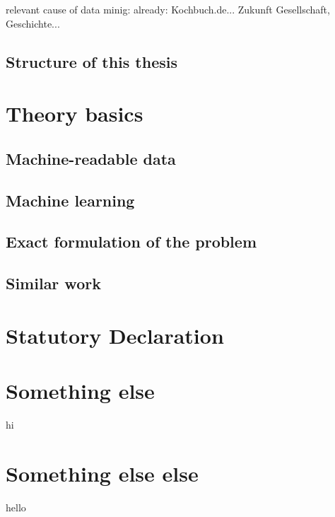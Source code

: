 \documentclass[12pt, twoside]{report}
\begin{document}
relevant cause of data minig:
	already: Kochbuch.de...
	Zukunft Gesellschaft, Geschichte...


\section{Structure of this thesis}

\chapter{Theory basics}
\section{Machine-readable data}
\section{Machine learning}
\section{Exact formulation of the problem}
\section{Similar work}



\appendix
\chapter{Statutory Declaration}


\chapter{Something else}
hi

\chapter{Something else else}
hello

\printbibliography
\end{document}
